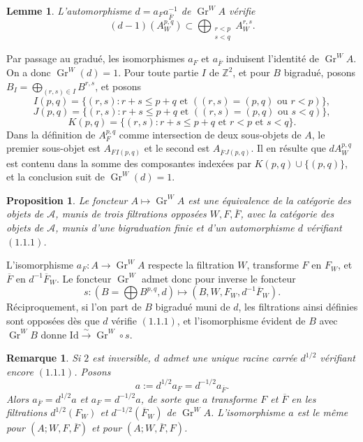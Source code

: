 \documentclass[11pt]{article}
\newtheorem{proposition}{Proposition}[section]
\newtheorem{lemma}{Lemme}[section]
\newtheorem{remark}{Remarque}[section]
\newcommand{\Gr}{\operatorname{Gr}}
\begin{document}
\begin{lemma}
L'automorphisme \(d=a_Fa_{\overline F}^{-1}\) de \(\Gr^WA\) vérifie
\begin{equation}\tag{1.1.1}
   (d-1)(A_W^{p,q})\subset
   \bigoplus_{\substack{r<p\\ s<q}} A_W^{r,s}.
\end{equation}
\end{lemma}

Par passage au gradué, les isomorphismes \(a_F\) et \(a_{\overline F}\) induisent l'identité de \(\Gr^WA\). On a donc \(\Gr^W(d)=1\). Pour toute partie \(I\) de \(\mathbb Z^2\), et pour \(B\) bigradué, posons \(B_I=\bigoplus_{(r,s)\in I}B^{r,s}\), et posons
\[
 I(p,q)=\{(r,s):r+s\le p+q\text{ et }((r,s)=(p,q)\text{ ou }r<p)\},
\]
\[
 J(p,q)=\{(r,s):r+s\le p+q\text{ et }((r,s)=(p,q)\text{ ou }s<q)\},
\]
\[
 K(p,q)=\{(r,s):r+s\le p+q\text{ et }r<p\text{ et }s<q\}.
\]
Dans la définition de \(A_F^{p,q}\) comme intersection de deux sous-objets de \(A\), le premier sous-objet est \(A_F{}_{I(p,q)}\) et le second est \(A_{\overline F}{}_{J(p,q)}\). Il en résulte que \(dA_W^{p,q}\) est contenu dans la somme des composantes indexées par \(K(p,q)\cup\{(p,q)\}\), et la conclusion suit de \(\Gr^W(d)=1\).

\begin{proposition}\label{prop:trois-filtrations}
Le foncteur \(A\mapsto \Gr^WA\) est une équivalence de la catégorie des objets de \(\mathcal A\), munis de trois filtrations opposées \(W,F,\overline F\), avec la catégorie des objets de \(\mathcal A\), munis d'une bigraduation finie et d'un automorphisme \(d\) vérifiant \((1.1.1)\).
\end{proposition}

L'isomorphisme \(a_F:A\to\Gr^WA\) respecte la filtration \(W\), transforme \(F\) en \(F_W\), et \(\overline F\) en \(d^{-1}\overline F_W\). Le foncteur \(\Gr^W\) admet donc pour inverse le foncteur
\[
 s:(B=\bigoplus B^{p,q},d)\longmapsto (B,W,F_W,d^{-1}\overline F_W).
\]
Réciproquement, si l'on part de \(B\) bigradué muni de \(d\), les filtrations ainsi définies sont opposées dès que \(d\) vérifie \((1.1.1)\), et l'isomorphisme évident de \(B\) avec \(\Gr^WB\) donne \(\mathrm{Id}\xrightarrow{\sim}\Gr^W\circ s\).

\begin{remark}
Si \(2\) est inversible, \(d\) admet une unique racine carrée \(d^{1/2}\) vérifiant encore \((1.1.1)\). Posons
\[
 a:=d^{1/2}a_F=d^{-1/2}a_{\overline F}.
\]
Alors \(a_{\overline F}=d^{1/2}a\) et \(a_F=d^{-1/2}a\), de sorte que \(a\) transforme \(F\) et \(\overline F\) en les filtrations \(d^{1/2}(F_W)\) et \(d^{-1/2}(\overline F_W)\) de \(\Gr^WA\). L'isomorphisme \(a\) est le même pour \((A;W,F,\overline F)\) et pour \((A;W,\overline F,F)\).
\end{remark}
\end{document}
